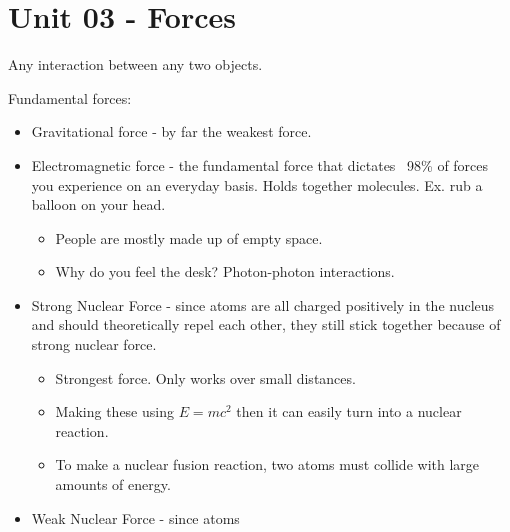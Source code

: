 \documentclass{scrreprt} %
\begin{document}
\section{Unit 03 - Forces}

\begin{definition}[Force]
	Any interaction between any two objects.
\end{definition}

\begin{definition}
	Fundamental forces:

	\begin{itemize}
		\item Gravitational force - by far the weakest force.
		\item Electromagnetic force - the fundamental force that dictates ~98\%
		of forces you experience on an everyday basis. Holds together molecules.
		Ex. rub a balloon on your head.
		\begin{itemize}
			\item People are mostly made up of empty space.
			\item Why do you feel the desk? Photon-photon interactions.
		\end{itemize}
		\item Strong Nuclear Force - since atoms are all charged positively
		in the nucleus and should theoretically repel each other, they still stick
		together because of strong nuclear force.
		\begin{itemize}
			\item Strongest force. Only works over small distances.
			\item Making these using $E=mc^2$ then it can
			easily turn into a nuclear reaction.
			\item To make a nuclear fusion reaction, two atoms must collide with large amounts
			of energy. 
		\end{itemize}
		\item Weak Nuclear Force - since atoms

	\end{itemize}
\end{definition}
\end{document}
